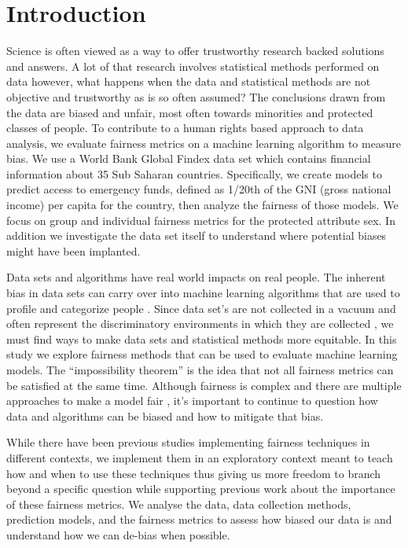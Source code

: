 \documentclass[water,article,submit,moreauthors,pdftex]{mdpi}
\begin{document}

\hypertarget{introduction}{%
\section{Introduction}\label{introduction}}

Science is often viewed as a way to offer trustworthy research backed
solutions and answers. A lot of that research involves statistical
methods performed on data however, what happens when the data and
statistical methods are not objective and trustworthy as is so often
assumed? The conclusions drawn from the data are biased and unfair, most
often towards minorities and protected classes of people. To contribute
to a human rights based approach to data analysis, we evaluate fairness
metrics on a machine learning algorithm to measure bias. We use a World
Bank Global Findex data set which contains financial information about
35 Sub Saharan countries. Specifically, we create models to predict
access to emergency funds, defined as 1/20th of the GNI (gross national
income) per capita for the country, then analyze the fairness of those
models. We focus on group and individual fairness metrics for the
protected attribute sex. In addition we investigate the data set itself
to understand where potential biases might have been implanted.

Data sets and algorithms have real world impacts on real people. The
inherent bias in data sets can carry over into machine learning
algorithms that are used to profile and categorize people
\citep{navarro2021risk, hellstrom2020bias}. Since data set's are not
collected in a vacuum and often represent the discriminatory
environments in which they are collected
\citep{barocas_fairness_nodate}, we must find ways to make data sets and
statistical methods more equitable. In this study we explore fairness
methods that can be used to evaluate machine learning models. The
``impossibility theorem'' is the idea that not all fairness metrics can
be satisfied at the same time\citep{kleinberg2016inherent}. Although
fairness is complex and there are multiple approaches to make a model
fair \citep{kypraiou_what_2021, green2018myth}, it's important to
continue to question how data and algorithms can be biased and how to
mitigate that bias.

While there have been previous studies implementing fairness techniques
in different contexts\citep{deho2022existing, kim2022information}, we
implement them in an exploratory context meant to teach how and when to
use these techniques thus giving us more freedom to branch beyond a
specific question while supporting previous work about the importance of
these fairness metrics\citep{anahideh2022fair, barocas_fairness_nodate}.
We analyse the data, data collection methods, prediction models, and the
fairness metrics to assess how biased our data is and understand how we
can de-bias when possible.
\end{document}
